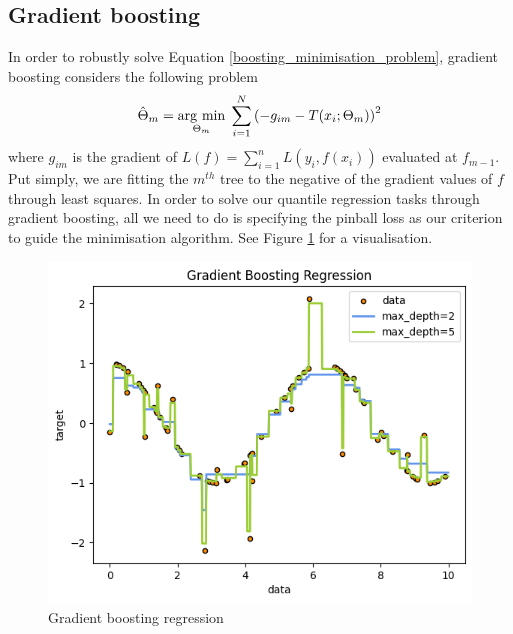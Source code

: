 \subsection{Gradient boosting}
In order to robustly solve Equation \ref{boosting_minimisation_problem}, gradient boosting considers the following problem
\begin{equation}
    \hat{\Theta}_m=\underset{\Theta_m}{\operatorname{arg}\,\operatorname{min}}\;\sum\limits_{i=1}^{N}\left(-g_{im}-T(x_i;\Theta_m)\right)^2
\end{equation}
where $g_{im}$ is the gradient of $L(f)=\sum\limits_{i=1}^n L(y_i, f(x_i))$ evaluated at $f_{m-1}$. Put simply, we are fitting the $m^{th}$ tree to the negative of the gradient values of $f$ through least squares.
In order to solve our quantile regression tasks through gradient boosting, all we need to do is specifying the pinball loss as our criterion to guide the minimisation algorithm. See Figure \ref{fig:gradient_boosting} for a visualisation.
\begin{figure}
    \includegraphics[width=\textwidth]{images/gradient_boosting.png}
    \caption{Gradient boosting regression}
    \label{fig:gradient_boosting}
\end{figure}



